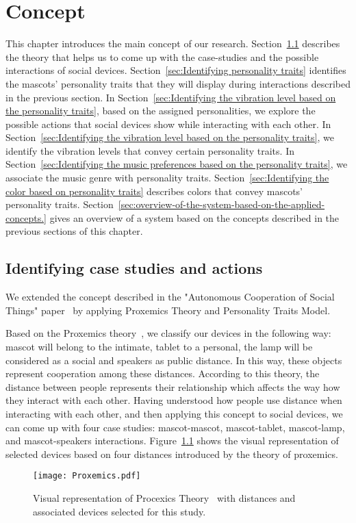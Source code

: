 \chapter{Concept}
\label{ch:concept}

This chapter introduces the main concept of our research.
Section~\ref{sec:Identifying case studies and actions} describes the theory that helps us
to come up with the case-studies and the possible interactions of social devices.
Section~\ref{sec:Identifying personality traits} identifies the mascots' personality traits
that they will display during interactions described in the previous section.
In Section~\ref{sec:Identifying the vibration level based on the personality traits},
based on the assigned personalities, we explore the possible actions
that social devices show while interacting with each other.
In Section~\ref{sec:Identifying the vibration level based on the personality traits},
we identify the vibration levels that convey certain personality traits.
In Section~\ref{sec:Identifying the music preferences based on the personality traits},
we associate the music genre with personality traits.
Section~\ref{sec:Identifying the color based on personality traits} describes
colors that convey mascots' personality traits.
Section~\ref{sec:overview-of-the-system-based-on-the-applied-concepts.} gives an overview of a system
based on the concepts described in the previous sections of this chapter.

\section{Identifying case studies and actions}
\label{sec:Identifying case studies and actions}
We extended the concept described in the "Autonomous Cooperation of Social Things" paper~\cite{okada2016autonomous}
by applying Proxemics Theory and Personality Traits Model.

Based on the Proxemics theory~\cite{hall1966hidden, hall1963system}, we classify our devices in the following way:
mascot will belong to the intimate, tablet to a personal, the
lamp will be considered as a social and speakers as public distance.
In this way, these objects represent cooperation among these distances.
According to this theory, the distance between people represents their
relationship which affects the way how they interact with each other.
Having understood how people use distance when interacting with each other,
and then applying this concept to social devices, we can come up with four case studies:
mascot-mascot, mascot-tablet, mascot-lamp, and mascot-speakers interactions.
Figure~\ref{fig:Proxemics} shows the visual representation of selected devices based on
four distances introduced by the theory of proxemics.
\begin{figure}[hbt!]
    \centering
    \texttt{[image: Proxemics.pdf]}
    \caption{Visual representation of Procexics Theory~\cite{hall1966hidden, hall1963system} with distances and associated devices selected for
    this study.}
    \label{fig:Proxemics}
\end{figure}

